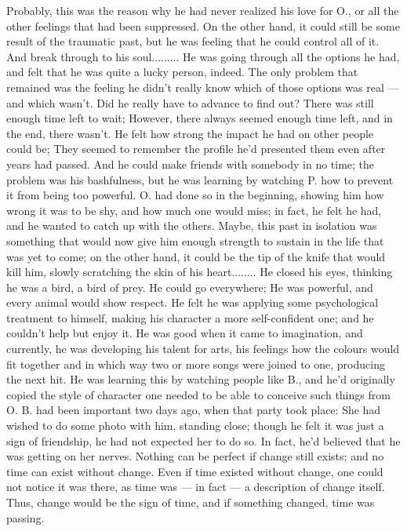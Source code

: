 Probably, this was the reason why he had never realized his love for O., or all the other feelings that had been suppressed. On the other hand, it could still be some result of the traumatic past, but he was feeling that he could control all of it. 
And break through to his soul.........
He was going through all the options he had, and felt that he was quite a lucky person, indeed. The only problem that remained was the feeling he didn't really know which of those options was real --- and which wasn't. Did he really have to advance to find out?
There was still enough time left to wait; However, there always seemed enough time left, and in the end, there wasn't. 
He felt how strong the impact he had on other people could be; They seemed to remember the profile he'd presented them even after years had passed. 
And he could make friends with somebody in no time; the problem was his bashfulness, but he was learning by watching P. how to prevent it from being too powerful. O. had done so in the beginning, showing him how wrong it was to be shy, and how much one would miss; in fact, he felt he had, and he wanted to catch up with the others. Maybe, this past in isolation was something that would now give him enough strength to sustain in the life that was yet to come; on the other hand, it could be the tip of the knife that would kill him, slowly scratching the skin of his heart........
He closed his eyes, thinking he was a bird, a bird of prey. He could go everywhere; He was powerful, and every animal would show respect. He felt he was applying some psychological treatment to himself, making his character a more self-confident one; and he couldn't help but enjoy it. He was good when it came to imagination, and currently, he was developing his talent for arts, his feelings how the colours would fit together and in which way two or more songs were joined to one, producing the next hit. 
He was learning this by watching people like B., and he'd originally copied the style of character one needed to be able to conceive such things from O. B. had been important two days ago, when that party took place: She had wished to do some photo with him, standing close; though he felt it was just a sign of friendship, he had not expected her to do so. In fact, he'd believed that he was getting on her nerves. 
Nothing can be perfect if change still exists; and no time can exist without change. Even if time existed without change, one could not notice it was there, as time was --- in fact --- a description of change itself. Thus, change would be the sign of time, and if something changed, time was passing. 
